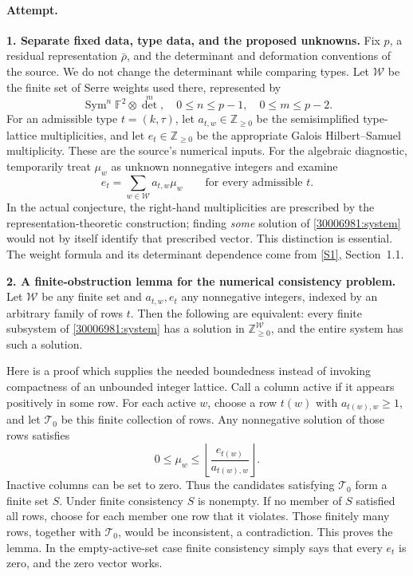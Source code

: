 \documentclass[11pt,a4paper]{article}
\newcommand{\Z}{\mathbb{Z}}
\newcommand{\F}{\mathbb{F}}
\newcommand{\sref}[2]{\hyperlink{source:#1:#2}{[S#2]}}
\numberwithin{equation}{section}
\begin{document}
\paragraph{Attempt.}
\textbf{1. Separate fixed data, type data, and the proposed unknowns.}
Fix $p$, a residual representation $\bar\rho$, and the determinant and
deformation conventions of the source. We do not change the determinant
while comparing types. Let $\mathcal W$ be the finite set of Serre
weights used there, represented by
\[
 \operatorname{Sym}^n\F^2\otimes\det^m,
       \quad 0\le n\le p-1,\quad0\le m\le p-2.
\]
For an admissible type $t=(k,\tau)$, let $a_{t,w}\in\Z_{\ge0}$ be the
semisimplified type-lattice multiplicities, and let $e_t\in\Z_{\ge0}$
be the appropriate Galois Hilbert--Samuel multiplicity. These are the
source's numerical inputs. For the algebraic diagnostic, temporarily
treat $\mu_w$ as unknown nonnegative integers and examine
\begin{equation}\label{30006981:system}
 e_t=\sum_{w\in\mathcal W}a_{t,w}\mu_w
                      \qquad\text{for every admissible }t.
\end{equation}
In the actual conjecture, the right-hand multiplicities are prescribed
by the representation-theoretic construction; finding \emph{some}
solution of \eqref{30006981:system} would not by itself identify that
prescribed vector. This distinction is essential. The weight formula
and its determinant dependence come from \sref{30006981}{1}, Section~1.1.

\textbf{2. A finite-obstruction lemma for the numerical consistency problem.}
Let $\mathcal W$ be any finite set and $a_{t,w},e_t$ any nonnegative
integers, indexed by an arbitrary family of rows $t$. Then the following
are equivalent: every finite subsystem of \eqref{30006981:system} has a
solution in $\Z_{\ge0}^{\mathcal W}$, and the entire system has such a
solution.

Here is a proof which supplies the needed boundedness instead of invoking
compactness of an unbounded integer lattice. Call a column active if it
appears positively in some row. For each active $w$, choose a row
$t(w)$ with $a_{t(w),w}\ge1$, and let $\mathcal T_0$ be this finite
collection of rows. Any nonnegative solution of those rows satisfies
\begin{equation}\label{30006981:box}
 0\le\mu_w\le
 \left\lfloor\frac{e_{t(w)}}{a_{t(w),w}}\right\rfloor.
\end{equation}
Inactive columns can be set to zero. Thus the candidates satisfying
$\mathcal T_0$ form a finite set $S$. Under finite consistency $S$ is
nonempty. If no member of $S$ satisfied all rows, choose for each member
one row that it violates. Those finitely many rows, together with
$\mathcal T_0$, would be inconsistent, a contradiction. This proves
the lemma. In the empty-active-set case finite consistency simply says
that every $e_t$ is zero, and the zero vector works.
\end{document}

